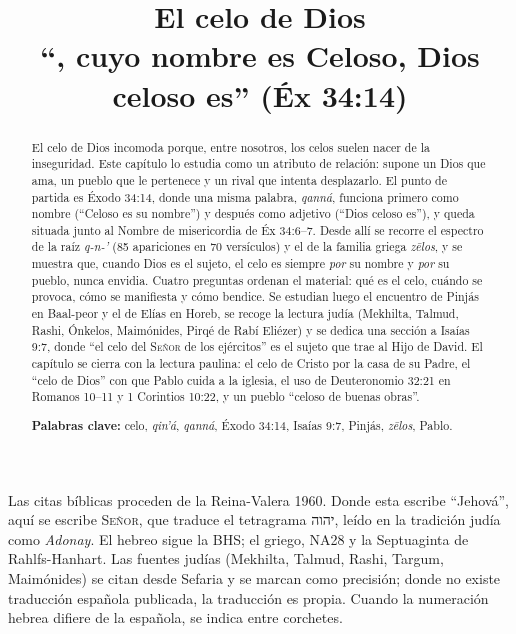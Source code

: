 \documentclass[11pt,letterpaper]{article}
\title{\color{azul}\bfseries El celo de Dios\\[4pt]\large\color{gris}\mdseries ``\SENOR, cuyo nombre es Celoso, Dios celoso es'' (Éx 34:14)}
\author{}\date{}
\newcommand{\heb}[1]{\mbox{\foreignlanguage{hebrew}{#1}}}
\newcommand{\SENOR}{\textsc{Señor}}
\begin{document}
\maketitle\thispagestyle{empty}

\begin{abstract}\noindent
El celo de Dios incomoda porque, entre nosotros, los celos suelen nacer de la inseguridad. Este capítulo lo estudia como un atributo de relación: supone un Dios que ama, un pueblo que le pertenece y un rival que intenta desplazarlo. El punto de partida es Éxodo 34:14, donde una misma palabra, \emph{qanná}, funciona primero como nombre (``Celoso es su nombre'') y después como adjetivo (``Dios celoso es''), y queda situada junto al Nombre de misericordia de Éx 34:6--7. Desde allí se recorre el espectro de la raíz \emph{q-n-'} (85 apariciones en 70 versículos) y el de la familia griega \emph{zēlos}, y se muestra que, cuando Dios es el sujeto, el celo es siempre \emph{por} su nombre y \emph{por} su pueblo, nunca envidia. Cuatro preguntas ordenan el material: qué es el celo, cuándo se provoca, cómo se manifiesta y cómo bendice. Se estudian luego el encuentro de Pinjás en Baal-peor y el de Elías en Horeb, se recoge la lectura judía (Mekhilta, Talmud, Rashi, Ónkelos, Maimónides, Pirqé de Rabí Eliézer) y se dedica una sección a Isaías 9:7, donde ``el celo del \SENOR{} de los ejércitos'' es el sujeto que trae al Hijo de David. El capítulo se cierra con la lectura paulina: el celo de Cristo por la casa de su Padre, el ``celo de Dios'' con que Pablo cuida a la iglesia, el uso de Deuteronomio 32:21 en Romanos 10--11 y 1 Corintios 10:22, y un pueblo ``celoso de buenas obras''.
\par\smallskip\noindent\textbf{Palabras clave:} celo, \emph{qin'á}, \emph{qanná}, Éxodo 34:14, Isaías 9:7, Pinjás, \emph{zēlos}, Pablo.\end{abstract}

\begin{nota}
Las citas bíblicas proceden de la Reina-Valera 1960. Donde esta escribe ``Jehová'', aquí se escribe \SENOR, que traduce el tetragrama \heb{יהוה}, leído en la tradición judía como \emph{Adonay}. El hebreo sigue la BHS; el griego, NA28 y la Septuaginta de Rahlfs-Hanhart. Las fuentes judías (Mekhilta, Talmud, Rashi, Targum, Maimónides) se citan desde Sefaria y se marcan como precisión; donde no existe traducción española publicada, la traducción es propia. Cuando la numeración hebrea difiere de la española, se indica entre corchetes.
\end{nota}
\end{document}
